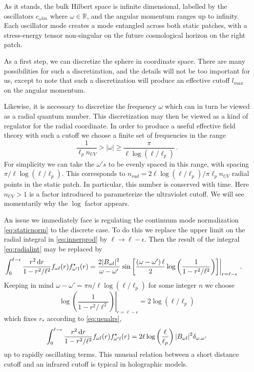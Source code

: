 \documentclass{brownthesis}
\def\dd{{\rm d}}
\begin{document}
As it stands, the bulk Hilbert space is infinite dimensional, labelled
by the oscillators $c_{\omega lm}$ where $\omega\in\mathbb{R}$,
and the angular momentum ranges up to infinity. Each oscillator mode
creates a mode entangled across both static patches, with a stress-energy
tensor non-singular on the future cosmological horizon on the right
patch.

As a first step, we can discretize the sphere in coordinate space.
There are many possibilities for such a discretization, and the details
will not be too important for us, except to note that such a discretization
will produce an effective cutoff $l_{max}$ on the angular momentum.

Likewise, it is necessary to discretize the frequency $\omega$ which
can in turn be viewed as a radial quantum number. This discretization
may then be viewed as a kind of regulator for the radial coordinate.
In order to produce a useful effective field theory with such a cutoff
we choose a finite set of frequencies in the range
\begin{equation}
\frac{1}{\ell_{p}n_{UV}}>|\omega|\geq\frac{\pi}{\ell\log\left(\ell/\ell_{p}\right)}\,.\label{eq:iruv}
\end{equation}
For simplicity we can take the $\omega's$ to be evenly spaced in
this range, with spacing $\pi/\ell\log\left(\ell/\ell_{p}\right)$.
This corresponds to $n_{rad}=2\ell\log(\ell/\ell_{p})/\pi\ell_{p}n_{UV}$
radial points in the static patch. In particular, this number is conserved
with time. Here $n_{UV}>1$ is a factor introduced to parameterize
the ultraviolet cutoff. We will see momentarily why the $\log$ factor
appears.

An issue we immediately face is regulating the continuum mode normalization
\eqref{eq:staticnorm} to the discrete case. To do this we replace
the upper limit on the radial integral in \eqref{eq:innerprod} by
$\ell\to\ell-\epsilon.$ Then the result of the integral \eqref{eq:radialint}
may be replaced by
\begin{align*}
\int_{0}^{\ell-\epsilon}\frac{r^{2}\,\dd r}{1-r^{2}/\ell^{2}}f_{\omega l}(r)f_{\omega'l}^{\star}(r) & =\frac{2|B_{\omega l}|^{2}}{\omega-\omega'}\left.\sin\left[\frac{\left(\omega-\omega'\right)\ell}{2}\log\left(\frac{1}{1-r^{2}/\ell^{2}}\right)\right]\right|_{r=\ell-\epsilon}\,.
\end{align*}
Keeping in mind $\omega-\omega'=\pi n/\ell\log\left(\ell/\ell_{p}\right)$
for some integer $n$ we choose
\begin{equation}
\left.\log\left(\frac{1}{1-r^{2}/\ell^{2}}\right)\right|_{r=\ell-\epsilon}=2\log\left(\ell/\ell_{p}\right)\label{eq:horpos}
\end{equation}
which fixes $r_{*}$ according to \eqref{eq:usualrs},
\[
\int_{0}^{\ell-\epsilon}\frac{r^{2}\,\dd r}{1-r^{2}/\ell^{2}}f_{\omega l}(r)f_{\omega'l}^{\star}(r)=2\ell\log\left(\frac{\ell}{\ell_{p}}\right)|B_{\omega l}|^{2}\delta_{\omega,\omega'}
\]
up to rapidly oscillating terms. This unusual relation between a short
distance cutoff and an infrared cutoff is typical in holographic models.
\end{document}
